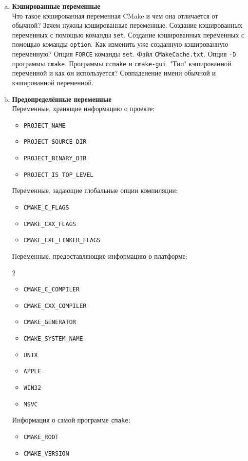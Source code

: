 \documentclass{article}
\begin{document}
\begin{enumerate}
\begin{enumerate}[a.]
\item \textbf{Кэшированные переменные}\\
Что такое кэшированная переменная CMake и чем она отличается от обычной? Зачем нужны кэшированные переменные. Создание кэшированных переменных с помощью команды \texttt{set}. Создание кэшированных переменных с помощью команды \texttt{option}. Как изменить уже созданную кэшированную переменную? Опция \texttt{FORCE} команды \texttt{set}. Файл \texttt{CMakeCache.txt}. Опция \texttt{-D} программы \texttt{cmake}. Программы \texttt{ccmake} и \texttt{cmake-gui}. "Тип"{} кэшированной переменной и как он используется? Совпаденение имени обычной и кэшированной переменной.


\item \textbf{Предопределённые переменные}\\
Переменные, хранящие информацию о проекте:
\begin{itemize}
\item \texttt{PROJECT\_NAME}
\item \texttt{PROJECT\_SOURCE\_DIR}
\item \texttt{PROJECT\_BINARY\_DIR}
\item \texttt{PROJECT\_IS\_TOP\_LEVEL}
\end{itemize}

Переменные, задающие глобальные опции компиляции:
\begin{itemize}
\item \texttt{CMAKE\_C\_FLAGS}
\item \texttt{CMAKE\_CXX\_FLAGS}
\item \texttt{CMAKE\_EXE\_LINKER\_FLAGS}
\end{itemize}

Переменные, предоставляющие информацию о платформе:
\begin{multicols}{2}
\begin{itemize}
\item \texttt{CMAKE\_C\_COMPILER}
\item \texttt{CMAKE\_CXX\_COMPILER}
\item \texttt{CMAKE\_GENERATOR}
\item \texttt{CMAKE\_SYSTEM\_NAME}
\item \texttt{UNIX}
\item \texttt{APPLE}
\item \texttt{WIN32}
\item \texttt{MSVC}
\end{itemize}
\end{multicols}
Информация о самой программе \texttt{cmake}:
\begin{itemize}
\item \texttt{CMAKE\_ROOT}
\item \texttt{CMAKE\_VERSION}
\end{itemize}


\end{enumerate}
\end{enumerate}
\end{document}
